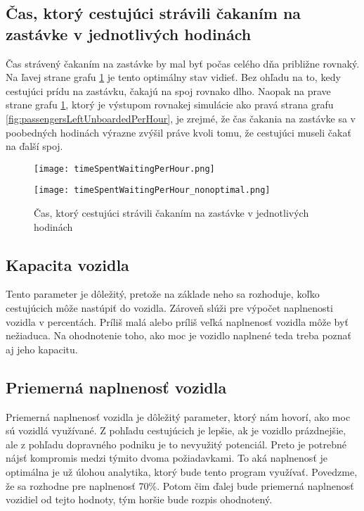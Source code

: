 \subsection*{Čas, ktorý cestujúci strávili čakaním na zastávke v jednotlivých hodinách}
Čas strávený čakaním na zastávke by mal byť počas celého dňa približne rovnaký.
Na ľavej strane grafu \ref{fig:timeSpentWaitingPerHour} je tento optimálny stav vidieť.
Bez ohľadu na to, kedy cestujúci prídu na zastávku, čakajú na spoj rovnako dlho.
Naopak na prave strane grafu \ref{fig:timeSpentWaitingPerHour}, ktorý je výstupom rovnakej simulácie ako pravá strana grafu \ref{fig:passengersLeftUnboardedPerHour}, je zrejmé, že čas čakania na zastávke sa v poobedných hodinách výrazne zvýšil práve kvoli tomu, že cestujúci museli čakať na ďalší spoj.
\begin{figure}[h]
  \label{fig:timeSpentWaitingPerHour}
  \centering
  \begin{minipage}{0.49\textwidth}
    \texttt{[image: timeSpentWaitingPerHour.png]}
  \end{minipage}
  \begin{minipage}{0.49\textwidth}
    \texttt{[image: timeSpentWaitingPerHour\_nonoptimal.png]}
  \end{minipage}
  \caption{Čas, ktorý cestujúci strávili čakaním na zastávke v jednotlivých hodinách}
\end{figure}

\subsection*{Kapacita vozidla}
Tento parameter je dôležitý, pretože na základe neho sa rozhoduje, koľko cestujúcich môže nastúpiť do vozidla.
Zároveň slúži pre výpočet naplnenosti vozidla v percentách.
Príliš malá alebo príliš veľká naplnenosť vozidla môže byť nežiaduca.
Na ohodnotenie toho, ako moc je vozidlo naplnené teda treba poznať aj jeho kapacitu.

\subsection*{Priemerná naplnenosť vozidla}
Priemerná naplnenosť vozidla je dôležitý parameter, ktorý nám hovorí, ako moc sú vozidlá využívané.
Z pohľadu cestujúcich je lepšie, ak je vozidlo prázdnejšie, ale z pohľadu dopravného podniku je to nevyužitý potenciál.
Preto je potrebné nájsť kompromis medzi týmito dvoma požiadavkami.
To aká naplnenosť je optimálna je už úlohou analytika, ktorý bude tento program využívať.
Povedzme, že sa rozhodne pre naplnenosť 70\%.
Potom čim ďalej bude priemerná naplnenosť vozidiel od tejto hodnoty, tým horšie bude rozpis ohodnotený.

